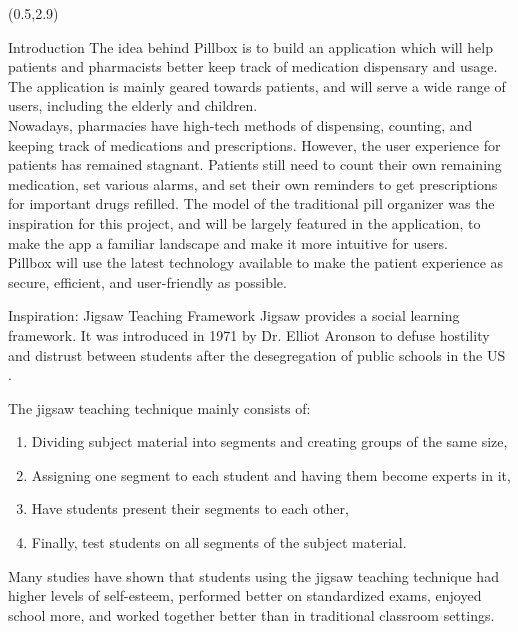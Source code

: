 \documentclass[22pt]{beamer}
\begin{document}
\begin{frame}[fragile]
\begin{textblock}{7.25}(0.5,2.9)

\begin{block}{Introduction}
The idea behind Pillbox is to build an application which will help patients and pharmacists better keep track of medication dispensary and usage. The application is mainly geared towards patients, and will serve a wide range of users, including the elderly and children. \\
Nowadays, pharmacies have high-tech methods of dispensing, counting, and keeping track of medications and prescriptions. However, the user experience for patients has remained stagnant. Patients still need to count their own remaining medication, set various alarms, and set their own reminders to get prescriptions for important drugs refilled. The model of the traditional pill organizer was the inspiration for this project, and will be largely featured in the application, to make the app a familiar landscape and make it more intuitive for users.\\
Pillbox will use the latest technology available to make the patient experience as secure, efficient, and user-friendly as possible.
\end{block}

\begin{block}{Inspiration: Jigsaw Teaching Framework}
Jigsaw provides a social learning framework. It was introduced in 1971 by Dr. Elliot Aronson to defuse hostility and distrust between students after the desegregation of public schools in the US \cite{aronson2002building}.

The jigsaw teaching technique mainly consists of:
\begin{enumerate}
    \item Dividing subject material into segments and creating groups of the same size,
    \item Assigning one segment to each student and having them become experts in it,
    \item Have students present their segments to each other,
    \item Finally, test students on all segments of the subject material.
\end{enumerate}

Many studies have shown that students using the jigsaw teaching technique had higher levels of self-esteem, performed better on standardized exams, enjoyed school more, and worked together better than in traditional classroom settings.


\end{block}
\end{textblock}
\end{frame}
\end{document}
